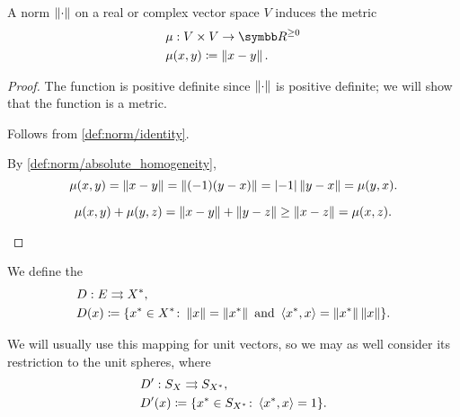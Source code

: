 \begin{definition}\label{def:norm_induced_metric}
  A norm \( \left\Vert \cdot \right\Vert \) on a real or complex vector space \( V \) induces the metric
  \begin{align*}
    &\mu: V \times V \to \R^{\geq 0} \\
    &\mu(x, y) \coloneqq \Norm{x - y}.
  \end{align*}
\end{definition}
\begin{proof}
  The function is positive definite since \( \left\Vert \cdot \right\Vert \) is positive definite; we will show that the function is a metric.

  \begin{description}
     Follows from \cref{def:norm/identity}.

     By \ref{def:norm/absolute_homogeneity},
    \begin{equation*}
      \mu(x, y) = \left\Vert  x - y  \right\Vert = \left\Vert  (-1) (y - x)  \right\Vert = \left\vert -1 \right\vert \left\Vert y - x \right\Vert = \mu(y, x).
    \end{equation*}

    \begin{equation*}
      \mu(x, y) + \mu(y, z) = \left\Vert x - y \right\Vert + \left\Vert y - z \right\Vert \geq \left\Vert x - z \right\Vert = \mu(x, z).
    \end{equation*}
  \end{description}
\end{proof}

\begin{definition}\cite[Example 2.26]{Phelps1993}
  We define the 
  \begin{align*}
    &D: E \rightrightarrows X^*, \\
    &D(x) \coloneqq \{ x^* \in X^* \colon \left\Vert x \right\Vert = \left\Vert x^* \right\Vert \text{ and } \left\langle x^*, x \right\rangle = \left\Vert x^* \right\Vert \left\Vert x \right\Vert \}.
  \end{align*}
\end{definition}

\begin{remark}
  We will usually use this mapping for unit vectors, so we may as well consider its restriction to the unit spheres, where
  \begin{align*}
    &D': S_X \rightrightarrows S_{X^*}, \\
    &D'(x) \coloneqq \{ x^* \in S_{X^*} \colon \left\langle x^*, x \right\rangle = 1 \}.
  \end{align*}
\end{remark}

